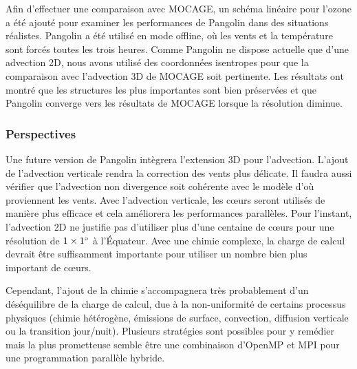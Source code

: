 Afin d'effectuer une comparaison avec MOCAGE, un schéma linéaire pour l'ozone a
été ajouté pour examiner les performances de Pangolin dans des situations
réalistes. Pangolin a été utilisé en mode offline, où les vents et la
température sont forcés toutes les trois heures. Comme Pangolin ne dispose
actuelle que d'une advection 2D, nous avons utilisé des coordonnées isentropes
pour que la comparaison avec l'advection 3D de MOCAGE soit pertinente. Les
résultats ont montré que les structures les plus importantes sont bien
préservées et que Pangolin converge vers les résultats de MOCAGE lorsque la
résolution diminue.

\subsubsection*{Perspectives}
Une future version de Pangolin intègrera l'extension 3D pour l'advection.
L'ajout de l'advection verticale rendra la correction des vents plus délicate.
Il faudra aussi vérifier que l'advection non divergence soit cohérente avec le
modèle d'où proviennent les vents. Avec l'advection verticale, les c\oe{}urs seront
utilisés de manière plus efficace et cela améliorera les performances
parallèles. Pour l'instant, l'advection 2D ne justifie pas d'utiliser plus d'une
centaine de c\oe{}urs pour une résolution de $1\times1^{\circ}$ à l'Équateur. Avec
une chimie complexe, la charge de calcul devrait être suffisamment importante
pour utiliser un nombre bien plus important de c\oe{}urs.

Cependant, l'ajout de la chimie s'accompagnera très probablement d'un
déséquilibre de la charge de calcul, due à la non-uniformité de certains
processus physiques (chimie hétérogène, émissions de surface, convection,
diffusion verticale ou la transition jour/nuit). Plusieurs stratégies sont
possibles pour y remédier mais la plus prometteuse semble être une combinaison
d'OpenMP et MPI pour une programmation parallèle hybride.
